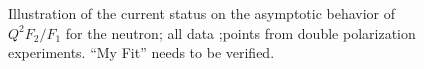 \begin{figure}
\begin{center}
\caption{Illustration of the current status on the asymptotic behavior of $Q^2F_2/F_1$ for the neutron; all data ;points from double polarization experiments. ``My Fit'' needs to be verified.}
\label{fig:pf2f1p}
\end{center}
\end{figure}

